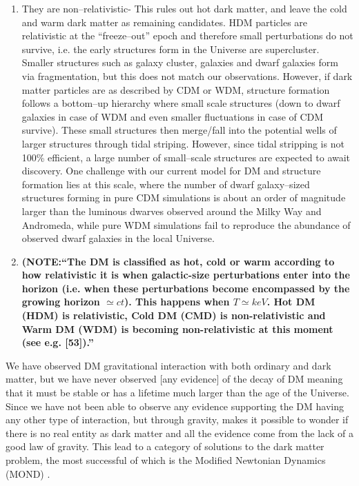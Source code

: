 \documentclass[paper=a4, fontsize=11pt]{scrartcl} %
\numberwithin{equation}{section} %
\numberwithin{figure}{section} %
\numberwithin{table}{section} %
\begin{document}
\begin{enumerate}
  \item They are non--relativistic- This rules out hot dark matter, and leave the cold and warm dark matter as remaining candidates. HDM particles are relativistic at the ``freeze--out'' epoch and therefore small perturbations do not survive, i.e. the early structures form in the Universe are supercluster. Smaller structures such as galaxy cluster, galaxies and dwarf galaxies form via fragmentation, but this does not match our observations. However, if dark matter particles are as described by CDM or WDM, structure formation follows a bottom--up hierarchy where small scale structures (down to dwarf galaxies in case of WDM and even smaller fluctuations in case of CDM survive). These small structures then merge/fall into the potential wells of larger structures through tidal striping. However, since tidal stripping is not 100\% efficient, a large number of small--scale structures are expected to await discovery. One challenge with our current model for DM and structure formation lies at this scale, where the number of dwarf galaxy--sized structures forming in pure CDM simulations is about an order of magnitude larger than the luminous dwarves observed around the Milky Way and Andromeda, while pure WDM simulations fail to reproduce the abundance of observed dwarf galaxies in the local Universe.
  \item {\bf (NOTE:``The DM is classified as hot, cold or warm according to how relativistic it is when galactic-size perturbations enter into the horizon (i.e. when these perturbations become encompassed by the growing horizon $\simeq ct$). This happens when $T \simeq keV$. Hot DM (HDM) is relativistic, Cold DM (CMD) is non-relativistic and Warm DM (WDM) is becoming non-relativistic at this moment (see e.g. [53]).''}
  \end{enumerate}
  
We have observed DM gravitational interaction with both ordinary and dark matter, but we have never observed [any evidence] of the decay of DM meaning that it must be stable or has a lifetime much larger than the age of the Universe. Since we have not been able to observe any evidence supporting the DM having any other type of interaction, but through gravity, makes it possible to wonder if there is no real entity as dark matter and all the evidence come from the lack of a good law of gravity. This lead to a category of solutions to the dark matter problem, the most successful of which is the Modified Newtonian Dynamics (MOND) \citep[14\&15][See erratum for 15!]{Milgrom1983, Bekestein2005}.
\end{document}
